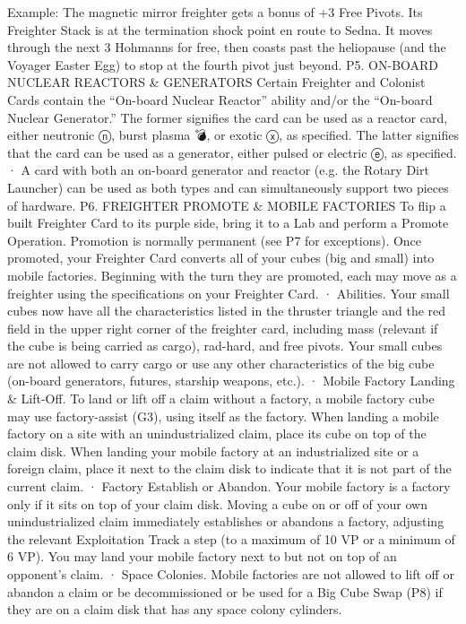 \documentclass[a4paper]{book}
\begin{document}
Example: The magnetic mirror freighter gets a bonus of +3 Free Pivots.  Its Freighter Stack is at the termination shock point en route to Sedna. It moves through the next 3 Hohmanns for free, then coasts past the heliopause (and the Voyager Easter Egg) to stop at the fourth pivot just beyond.
P5. ON-BOARD NUCLEAR REACTORS \& GENERATORS
Certain Freighter and Colonist Cards contain the “On-board Nuclear Reactor” ability and/or the “On-board Nuclear Generator.” The former signifies the card can be used as a reactor card, either neutronic ⓝ, burst plasma 💣, or exotic ⓧ, as specified. The latter signifies that the card can be used as a generator, either pulsed  or electric ⓔ, as specified.
·   	A card with both an on-board generator and reactor (e.g. the Rotary Dirt Launcher) can be used as both types and can simultaneously support two pieces of hardware.
P6. FREIGHTER PROMOTE \& MOBILE FACTORIES
To flip a built Freighter Card to its purple side, bring it to a Lab and perform a Promote Operation. Promotion is normally permanent (see P7 for exceptions). Once promoted, your Freighter Card converts all of your cubes (big and small) into mobile factories. Beginning with the turn they are promoted, each may move as a freighter using the specifications on your Freighter Card.
·   	Abilities. Your small cubes now have all the characteristics listed in the thruster triangle and the red field in the upper right corner of the freighter card, including mass (relevant if the cube is being carried as cargo), rad-hard, and free pivots. Your small cubes are not allowed to carry cargo or use any other characteristics of the big cube (on-board generators, futures, starship weapons, etc.).
·       Mobile Factory Landing \& Lift-Off. To land or lift off a claim without a factory, a mobile factory cube may use factory-assist (G3), using itself as the factory. When landing a mobile factory on a site with an unindustrialized claim, place its cube on top of the claim disk. When landing your mobile factory at an industrialized site or a foreign claim, place it next to the claim disk to indicate that it is not part of the current claim.
·   	Factory Establish or Abandon. Your mobile factory is a factory only if it sits on top of your claim disk. Moving a cube on or off of your own unindustrialized claim immediately establishes or abandons a factory, adjusting the relevant Exploitation Track a step (to a maximum of 10 VP or a minimum of 6 VP). You may land your mobile factory next to but not on top of an opponent’s claim.
·   	Space Colonies. Mobile factories are not allowed to lift off or abandon a claim or be decommissioned or be used for a Big Cube Swap (P8) if they are on a claim disk that has any space colony cylinders.
\end{document}
